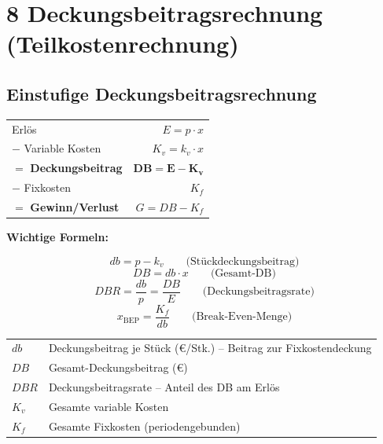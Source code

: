 \documentclass[10pt,a4paper]{article}
\begin{document}
\newpage

\section{8 \quad Deckungsbeitragsrechnung (Teilkostenrechnung)}

\begin{multicols}{2}

\subsection{Einstufige Deckungsbeitragsrechnung}

\begin{formelbox}
\renewcommand{\arraystretch}{1.15}
\begin{tabular}{@{}lr@{}}
Erlös & $E = p \cdot x$ \\
$-$ Variable Kosten & $K_v = k_v \cdot x$ \\
\hline
$=$ \textbf{Deckungsbeitrag} & $\mathbf{DB = E - K_v}$ \\
$-$ Fixkosten & $K_f$ \\
\hline
$=$ \textbf{Gewinn/Verlust} & $G = DB - K_f$ \\
\end{tabular}
\end{formelbox}

\textbf{Wichtige Formeln:}
\begin{formelbox}
\[
db = p - k_v \qquad \text{(Stückdeckungsbeitrag)}
\]
\[
DB = db \cdot x \qquad \text{(Gesamt-DB)}
\]
\[
DBR = \frac{db}{p} = \frac{DB}{E} \qquad \text{(Deckungsbeitragsrate)}
\]
\[
x_{\text{BEP}} = \frac{K_f}{db} \qquad \text{(Break-Even-Menge)}
\]
\end{formelbox}

\begin{tabular}{|L{2cm}|L{5cm}|}
\hline
{}
$db$ & Deckungsbeitrag je Stück (€/Stk.) -- Beitrag zur Fixkostendeckung \\
$DB$ & Gesamt-Deckungsbeitrag (€) \\
$DBR$ & Deckungsbeitragsrate -- Anteil des DB am Erlös \\
$K_v$ & Gesamte variable Kosten \\
$K_f$ & Gesamte Fixkosten (periodengebunden) \\
\hline
\end{tabular}


\end{multicols}
\end{document}

